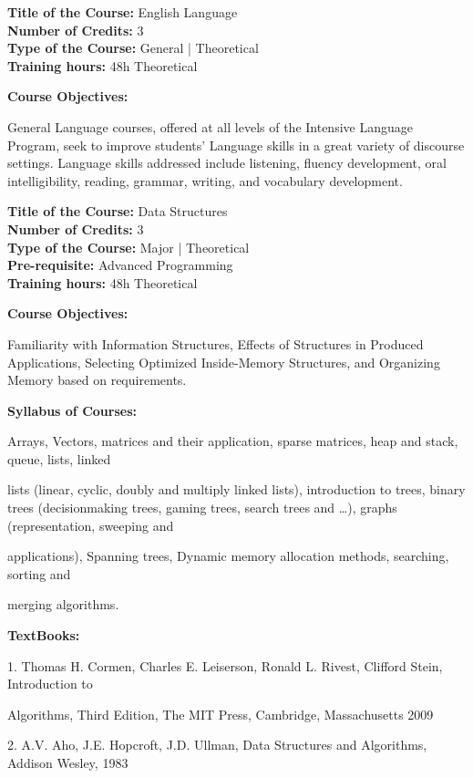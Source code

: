 \documentclass[12pt,a4paper]{article}
\begin{document}
\par\vspace{14pt}
\nopagebreak
\textbf{Title of the Course:} English Language\\
\textbf{Number of Credits:} 3\\
\textbf{Type of the Course:} General | Theoretical\\
\textbf{Training hours:} 48h Theoretical\par\vspace{4pt}
\textbf{Course Objectives:}\par\vspace{2pt}
General Language courses, offered at all levels of the Intensive Language Program, seek to
improve students' Language skills in a great variety of discourse settings. Language skills
addressed include listening, fluency development, oral intelligibility, reading, grammar, writing,
and vocabulary development.\par\vspace{4pt}

\newpage
\textbf{Title of the Course:} Data Structures\\
\textbf{Number of Credits:} 3\\
\textbf{Type of the Course:} Major | Theoretical\\
\textbf{Pre-requisite:} Advanced Programming\\
\textbf{Training hours:} 48h Theoretical\par\vspace{4pt}
\textbf{Course Objectives:}\par\vspace{2pt}
Familiarity with Information Structures, Effects of Structures in Produced Applications, Selecting
Optimized Inside-Memory Structures, and Organizing Memory based on requirements.\par\vspace{4pt}
\textbf{Syllabus of Courses:}\par\vspace{2pt}
Arrays, Vectors, matrices and their application, sparse matrices, heap and stack, queue, lists, linked\par
lists (linear, cyclic, doubly and multiply linked lists), introduction to trees, binary trees (decisionmaking trees, gaming trees, search trees and …), graphs (representation, sweeping and\par
applications), Spanning trees, Dynamic memory allocation methods, searching, sorting and\par
merging algorithms.\par\vspace{4pt}
\textbf{TextBooks:}\par\vspace{2pt}
1. Thomas H. Cormen, Charles E. Leiserson, Ronald L. Rivest, Clifford Stein, Introduction to\par
Algorithms, Third Edition, The MIT Press, Cambridge, Massachusetts 2009\par
2. A.V. Aho, J.E. Hopcroft, J.D. Ullman, Data Structures and Algorithms, Addison Wesley, 1983\par
\vspace{4pt}
\end{document}
